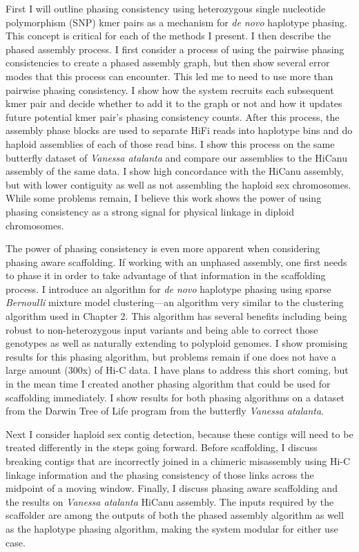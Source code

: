 \par{
 First I will outline phasing consistency using heterozygous single nucleotide polymorphism (SNP) kmer pairs as a mechanism for \textit{de novo} haplotype phasing. This concept is critical for each of the methods I present. I then describe the phased assembly process. I first consider a process of using the pairwise phasing consistencies to create a phased assembly graph, but then show several error modes that this process can encounter. This led me to need to use more than pairwise phasing consistency. I show how the system recruits each subsequent kmer pair and decide whether to add it to the graph or not and how it updates future potential kmer pair's phasing consistency counts. After this process, the assembly phase blocks are used to separate HiFi reads into haplotype bins and do haploid assemblies of each of those read bins. I show this process on the same butterfly dataset of \textit{Vanessa atalanta} and compare our assemblies to the HiCanu assembly of the same data. I show high concordance with the HiCanu assembly, but with lower contiguity as well as not assembling the haploid sex chromosomes. While some problems remain, I believe this work shows the power of using phasing consistency as a strong signal for physical linkage in diploid chromosomes.
}
 
 \par{
The power of phasing consistency is even more apparent when considering phasing aware scaffolding. If working with an unphased assembly, one first needs to phase it in order to take advantage of that information in the scaffolding process. I introduce an algorithm for \textit{de novo} haplotype phasing using sparse \textit{Bernoulli} mixture model clustering---an algorithm very similar to the clustering algorithm used in Chapter 2. This algorithm has several benefits including being robust to non-heterozygous input variants and being able to correct those genotypes as well as naturally extending to polyploid genomes. I show promising results for this phasing algorithm, but problems remain if one does not have a large amount (300x) of Hi-C data. I have plans to address this short coming, but in the mean time I created another phasing algorithm that could be used for scaffolding immediately.  I show results for both phasing algorithms on a dataset from the Darwin Tree of Life program from the butterfly \textit{Vanessa atalanta}. 
}

\par{
Next I consider haploid sex contig detection, because these contigs will need to be treated differently in the steps going forward. Before scaffolding, I discuss breaking contigs that are incorrectly joined in a chimeric misassembly using Hi-C linkage information and the phasing consistency of those links across the midpoint of a moving window. Finally, I discuss phasing aware scaffolding and the results on \textit{Vanessa atalanta} HiCanu assembly. The inputs required by the scaffolder are among the outputs of both the phased assembly algorithm as well as the haplotype phasing algorithm, making the system modular for either use case.
}


